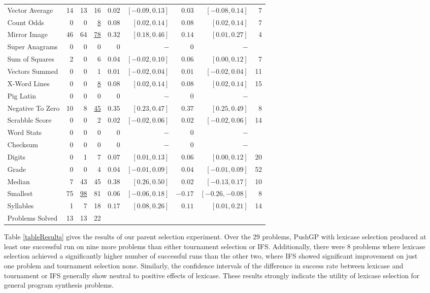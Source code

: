 \documentclass{sig-alternate}
\begin{document}
\begin{table*}[t]
\begin{tabular}{lrrr|rrrr|r}
Vector Average             & 14      & 13  & 16       & $0.02$ & $[-0.09, 0.13]$ & $0.03$ & $[-0.08, 0.14]$ & 7 \tabularnewline
Count Odds                 & 0       & 0   & \underline{8}        & $0.08$ & $[0.02, 0.14]$ & $0.08$ & $[0.02, 0.14]$ & 7 \tabularnewline
Mirror Image               & 46      & 64  & \underline{78}       & $0.32$ & $[0.18, 0.46]$ & $0.14$ & $[0.01, 0.27]$ & 4 \tabularnewline
Super Anagrams             & 0       & 0   & 0        & $0$ & $-$ & $0$ & $-$ &  \tabularnewline
Sum of Squares             & 2       & 0   & 6        & $0.04$ & $[-0.02, 0.10]$ & $0.06$ & $[0.00, 0.12]$ & 7 \tabularnewline
Vectors Summed             & 0       & 0   & 1        & $0.01$ & $[-0.02, 0.04]$ & $0.01$ & $[-0.02, 0.04]$ & 11 \tabularnewline
X-Word Lines               & 0       & 0   & \underline{8}        & $0.08$ & $[0.02, 0.14]$ & $0.08$ & $[0.02, 0.14]$ & 15 \tabularnewline
Pig Latin                  & 0       & 0   & 0        &   $0$ & $-$ & $0$ & $-$ &  \tabularnewline
Negative To Zero           & 10      & 8   & \underline{45}       & $0.35$ & $[0.23, 0.47]$ & $0.37$ & $[0.25, 0.49]$ & 8 \tabularnewline
Scrabble Score             & 0       & 0   & 2        & $0.02$ & $[-0.02, 0.06]$ & $0.02$ & $[-0.02, 0.06]$ & 14 \tabularnewline
Word Stats                 & 0       & 0   & 0        & $0$ & $-$ & $0$ & $-$ &  \tabularnewline
Checksum                   & 0       & 0   & 0        &  $0$ & $-$ & $0$ & $-$ &  \tabularnewline
Digits                     & 0       & 1   & 7        & $0.07$ & $[0.01, 0.13]$ & $0.06$ & $[0.00, 0.12]$ & 20 \tabularnewline
Grade                      & 0       & 0   & 4        & $0.04$ & $[-0.01, 0.09]$ & $0.04$ & $[-0.01, 0.09]$ & 52 \tabularnewline
Median                     & 7       & 43  & 45       & $0.38$ & $[0.26, 0.50]$ & $0.02$ & $[-0.13, 0.17]$ & 10 \tabularnewline
Smallest                   & 75      & \underline{98}  & 81       & $0.06$ & $[-0.06, 0.18]$ & $-0.17$ & $[-0.26, -0.08]$ & 8 \tabularnewline
Syllables                  & 1       & 7   & 18       & $0.17$ & $[0.08, 0.26]$ & $0.11$ & $[0.01, 0.21]$ & 14 \tabularnewline
\midrule
\rowcolor{white} Problems Solved          & 13       & 13      & 22 & & & & &   \\
\bottomrule
\end{tabular}
\end{table*}


Table \ref{tableResults} gives the results of our parent selection experiment. Over the 29 problems, PushGP with lexicase selection produced at least one successful run on nine more problems than either tournament selection or IFS. Additionally, there were 8 problems where lexicase selection achieved a significantly higher number of successful runs than the other two, where IFS showed significant improvement on just one problem and tournament selection none. Similarly, the confidence intervals of the difference in success rate between lexicase and tournament or IFS generally show neutral to positive effects of lexicase. These results strongly indicate the utility of lexicase selection for general program synthesis problems.
\end{document}
